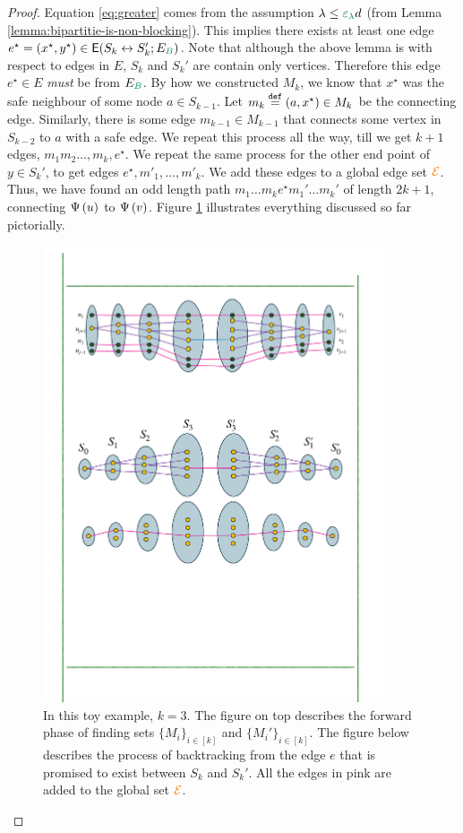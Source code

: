 \documentclass[11pt]{article}
\begin{document}
\begin{proof}
Equation \eqref{eq:greater} comes from the assumption $\lambda \leq \epsilonL d$ (from Lemma \ref{lemma:bipartitie-is-non-blocking}).
This implies there exists at least one edge $e^\star=(x^\star,y^\star) \in \CutEdgesSet{S_k}{S_k'}{E_{\GreenB}}$.
Note that although the above lemma is with respect to edges in $E$, $S_k$ and $S_k'$ are contain only  vertices.
Therefore this edge $e^\star \in E$ \emph{must} be from $E_{\GreenB}$.
By how we constructed $M_k$, we know that $x^\star$ was the safe neighbour of some node $a \in S_{k-1}$.
Let $m_k \text{}\overset{\mathtt{def}}{=} (a,x^\star) \in M_k$ be the connecting edge.
Similarly, there is some edge $m_{k-1} \in M_{k-1}$ that connects some vertex in $S_{k-2}$ to $a$ with a safe edge.
We repeat this process all the way, till we get $k+1$ edges, $m_1 m_2 \dots, m_k, e^\star$.
We repeat the same process for the other end point of $y \in S_k'$, to get edges $e^\star, m'_1, \dots, m'_k$.
We add these edges to a global edge set $\textcolor{orange}{\mathcal{E}}$.
Thus, we have found an odd length path $m_1\dots m_k e^\star m_1'\dots m_k'$ of length $2k+1$, connecting $\Psi\left(u\right)$ to $\Psi\left(v\right)$.
 Figure \ref{fig:baseB} illustrates everything discussed so far pictorially.

\begin{figure}
	\includegraphics[width=0.9\textwidth
	]{assets/BaseA.pdf}
	\caption{In this toy example, $k=3$. The figure on top describes the forward phase of finding sets $\{M_i\}_{i\in [k]}$ and $\{M_i'\}_{i\in [k]}$. The figure below describes the process of backtracking from the edge $e$ that is promised to exist between $S_k$ and $S_k'$.
    All the edges in pink are added to the global set $\textcolor{orange}{\mathcal{E}}$.}
	\label{fig:baseB}
\end{figure}




\end{proof}
\end{document}
